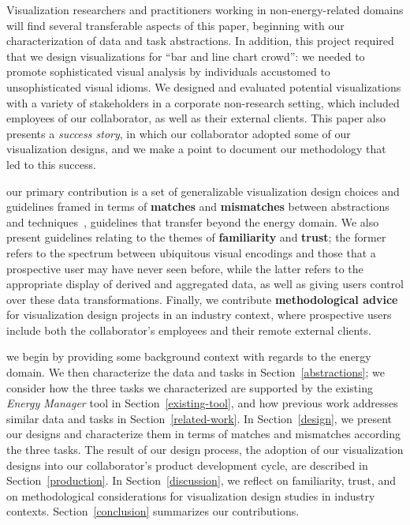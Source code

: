 \documentclass[journal]{vgtc}                %
\newcommand{\bstart}[1]{\vspace{1mm} \noindent{\textbf{#1:}}}
\begin{document}
Visualization researchers and practitioners working in non-energy-related domains will find several transferable aspects of this paper, beginning with our characterization of data and task abstractions.
In addition, this project required that we design visualizations for ``bar and line chart crowd'': we needed to promote sophisticated visual analysis by individuals accustomed to unsophisticated visual idioms.
We designed and evaluated potential visualizations with a variety of stakeholders in a corporate non-research setting, which included employees of our collaborator, as well as their external clients.
This paper also presents a {\it success story}, in which our collaborator adopted some of our visualization designs, and we make a point to document our methodology that led to this success.

\bstart{Contributions} our primary contribution is a set of generalizable visualization design choices and guidelines framed in terms of {\bf matches} and {\bf mismatches} between abstractions and techniques~\cite{Meyer2013}, guidelines that transfer beyond the energy domain.
We also present guidelines relating to the themes of {\bf familiarity} and {\bf trust}; the former refers to the spectrum between ubiquitous visual encodings and those that a prospective user may have never seen before, while the latter refers to the appropriate display of derived and aggregated data, as well as giving users control over these data transformations.
Finally, we contribute {\bf methodological advice} for visualization design projects in an industry context, where prospective users include both the collaborator's employees and their remote external clients.

\bstart{Outline} we begin by providing some background context with regards to the energy domain.
We then characterize the data and tasks in Section~\ref{abstractions}; we consider how the three tasks we characterized are supported by the existing {\it Energy Manager} tool in Section~\ref{existing-tool}, and how previous work addresses similar data and tasks in Section~\ref{related-work}.
In Section~\ref{design}, we present our designs and characterize them in terms of matches and mismatches according the three tasks.
The result of our design process, the adoption of our visualization designs into our collaborator's product development cycle, are described in Section~\ref{production}.
In Section~\ref{discussion}, we reflect on familiarity, trust, and on methodological considerations for visualization design studies in industry contexts.
Section~\ref{conclusion} summarizes our contributions.
\end{document}
